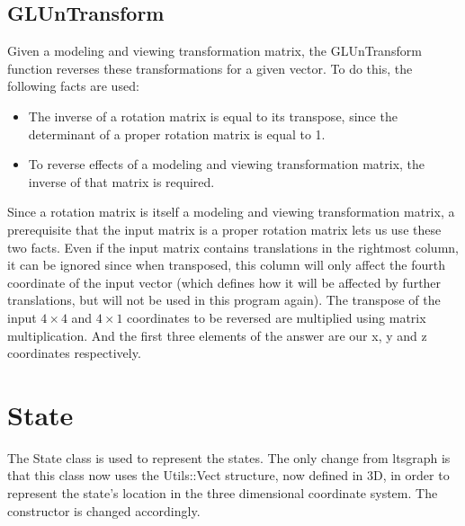 \documentclass[a4paper]{article}
\begin{document}
\subsection{GLUnTransform}
Given a modeling and viewing transformation matrix, the GLUnTransform function reverses these transformations for a given vector. To do this, the following facts are used:
\begin{itemize}
	\item The inverse of a rotation matrix is equal to its transpose, since the determinant of a proper rotation matrix is equal to 1.
	\item To reverse effects of a modeling and viewing transformation matrix, the inverse of that matrix is required.
\end{itemize}
Since a rotation matrix is itself a modeling and viewing transformation matrix, a prerequisite that the input matrix is a proper rotation matrix lets us use these two facts. Even if the input matrix contains translations in the rightmost column, it can be ignored since when transposed, this column will only affect the fourth coordinate of the input vector (which defines how it will be affected by further translations, but will not be used in this program again). The transpose of the input $4 \times 4$ and $4 \times 1$ coordinates to be reversed are multiplied using matrix multiplication. And the first three elements of the answer are our x, y and z coordinates respectively.
\section{State}
The State class is used to represent the states. The only change from ltsgraph is that this class now uses the Utils::Vect structure, now defined in 3D, in order to represent the state's location in the three dimensional coordinate system. The constructor is changed accordingly.
\end{document}
